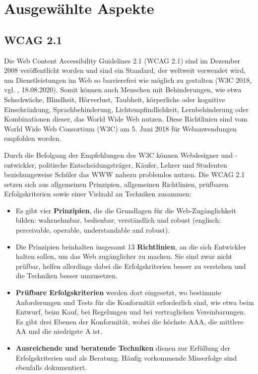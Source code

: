 \chapter{Ausgewählte Aspekte}
\section{WCAG 2.1}
\label{wcag_2_1}
Die Web Content Accessibility Guidelines 2.1 (WCAG 2.1) sind im Dezember 2008 veröffentlicht worden und sind ein Standard, der weltweit verwendet wird, um Dienstleistungen im Web so barrierefrei wie möglich zu gestalten (W3C 2018, vgl. \cite{wcag_2_1_2018}, 18.08.2020). Somit können auch Menschen mit Behinderungen, wie etwa Sehschwäche, Blindheit, Hörverlust, Taubheit, körperliche oder kognitive Einschränkung, Sprachbehinderung, Lichtempfindlichkeit, Lernbehinderung oder Kombinationen dieser, das World Wide Web nutzen. Diese Richtlinien sind vom World Wide Web Consortium (W3C) am 5. Juni 2018 für Webanwendungen empfohlen worden.

Durch die Befolgung der Empfehlungen des W3C können Webdesigner und -entwickler, politische Entscheidungsträger, Käufer, Lehrer und Studenten beziehungsweise Schüler das WWW nahezu problemlos nutzen. Die WCAG 2.1 setzen sich aus allgemeinen Prinzipien, allgemeinen Richtlinien, prüfbaren Erfolgskriterien sowie einer Vielzahl an Techniken zusammen:

\begin{itemize}
	\item Es gibt vier \textbf{Prinzipien}, die die Grundlagen für die Web-Zugänglichkeit bilden: wahrnehmbar, bedienbar, verständlich und robust (englisch: perceivable, operable, understandable and robust).
	\item Die Prinzipien beinhalten insgesamt 13 \textbf{Richtlinien}, an die sich Entwickler halten sollen, um das Web zugänglicher zu machen. Sie sind zwar nicht prüfbar, helfen allerdings dabei die Erfolgskriterien besser zu verstehen und die Techniken besser umzusetzen.
	\item \textbf{Prüfbare Erfolgskriterien} werden dort eingesetzt, wo bestimmte Anforderungen und Tests für die Konformität erforderlich sind, wie etwa beim Entwurf, beim Kauf, bei Regelungen und bei vertraglichen Vereinbarungen. Es gibt drei Ebenen der Konformität, wobei die höchste AAA, die mittlere AA und die niedrigste A ist.
	\item \textbf{Ausreichende und beratende Techniken} dienen zur Erfüllung der Erfolgskriterien und als Beratung. Häufig vorkommende Misserfolge sind ebenfalls dokumentiert.
\end{itemize}

